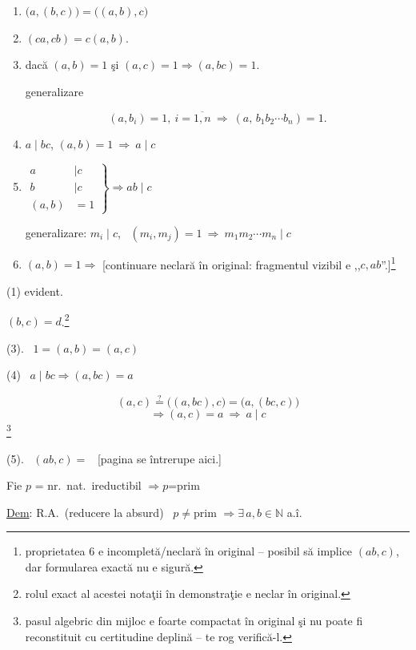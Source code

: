 \begin{enumerate}
\item[1.] $\big(a,(b,c)\big) = \big((a,b),c\big)$
\item[2.] $(ca,cb) = c(a,b)$.
\item[3.] dacă $(a,b)=1$ şi $(a,c)=1 \Rightarrow (a,bc)=1$.

\noindent generalizare

\[
(a,b_i)=1,\ i=\overline{1,n} \ \Rightarrow \ (a,\,b_1b_2\cdots b_n)=1.
\]

\item[4.] $a\mid bc$, $(a,b)=1 \ \Rightarrow \ a\mid c$

\item[5.] $\left.\begin{aligned} a&\mid c\\ b&\mid c\\ (a,b)&=1\end{aligned}\right\} \Rightarrow ab\mid c$

\noindent generalizare: \quad $m_i\mid c$, \ $(m_i,m_j)=1 \ \Rightarrow \ m_1m_2\cdots m_n\mid c$

\item[6.] $(a,b)=1 \Rightarrow$ [continuare neclară în original: fragmentul vizibil e ,,$c,ab$''.]\footnote{proprietatea 6 e incompletă/neclară în original -- posibil să implice $(ab,c)$, dar formularea exactă nu e sigură.}
\end{enumerate}

\bigskip
\noindent (1) evident.

\noindent $(b,c)=d$.\footnote{rolul exact al acestei notaţii în demonstraţie e neclar în original.}

\bigskip
\noindent (3). \ $1=(a,b)=(a,c)$

\bigskip
\noindent (4) \ $a\mid bc \Rightarrow (a,bc)=a$

\[
(a,c) \overset{?}{=} \big((a,bc),c\big) = \big(a,(bc,c)\big)
\]
\[
\Rightarrow (a,c)=a \ \Rightarrow \ a\mid c
\]
\noindent\footnote{pasul algebric din mijloc e foarte compactat în original şi nu poate fi reconstituit cu certitudine deplină -- te rog verifică-l.}

\bigskip
\noindent (5). \ $(ab,c)=$ \ [pagina se întrerupe aici.]

\bigskip
\noindent Fie $p$ = nr.\ nat.\ ireductibil $\Rightarrow p$=prim

\noindent\underline{Dem}: R.A.\ (reducere la absurd) \ $p\neq$prim $\Rightarrow \exists\,a,b\in\mathbb{N}$ a.î.

